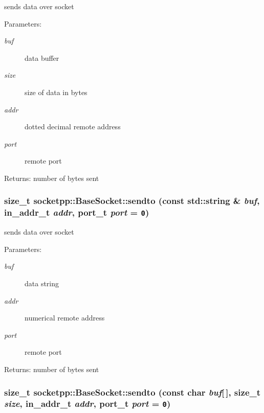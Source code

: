 sends data over socket 

\begin{Desc}
\item[Parameters:]
\begin{description}
\item[{\em buf}]data buffer \item[{\em size}]size of data in bytes \item[{\em addr}]dotted decimal remote address \item[{\em port}]remote port \end{description}
\end{Desc}
\begin{Desc}
\item[Returns:]number of bytes sent \end{Desc}
\hypertarget{classsocketpp_1_1BaseSocket_d12e08b6f67a95a3181403c70f306f88}{
\subsubsection[{sendto}]{\setlength{\rightskip}{0pt plus 5cm}size\_\-t socketpp::BaseSocket::sendto (const std::string \& {\em buf}, \/  in\_\-addr\_\-t {\em addr}, \/  {\bf port\_\-t} {\em port} = {\tt 0})}}
\label{classsocketpp_1_1BaseSocket_d12e08b6f67a95a3181403c70f306f88}


sends data over socket 

\begin{Desc}
\item[Parameters:]
\begin{description}
\item[{\em buf}]data string \item[{\em addr}]numerical remote address \item[{\em port}]remote port \end{description}
\end{Desc}
\begin{Desc}
\item[Returns:]number of bytes sent \end{Desc}
\hypertarget{classsocketpp_1_1BaseSocket_33ef257bb6eb0f23ae0680df57738f3a}{
\subsubsection[{sendto}]{\setlength{\rightskip}{0pt plus 5cm}size\_\-t socketpp::BaseSocket::sendto (const char {\em buf}\mbox{[}$\,$\mbox{]}, \/  size\_\-t {\em size}, \/  in\_\-addr\_\-t {\em addr}, \/  {\bf port\_\-t} {\em port} = {\tt 0})}}
\label{classsocketpp_1_1BaseSocket_33ef257bb6eb0f23ae0680df57738f3a}


